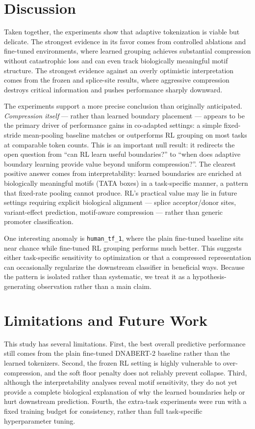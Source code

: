 \documentclass[sigconf,screen]{acmart}
\newcommand{\dnabert}{DNABERT-2\xspace}
\begin{document}
\section{Discussion}
Taken together, the experiments show that adaptive tokenization is viable but delicate. The strongest evidence in its favor comes from controlled ablations and fine-tuned environments, where learned grouping achieves substantial compression without catastrophic loss and can even track biologically meaningful motif structure. The strongest evidence against an overly optimistic interpretation comes from the frozen and splice-site results, where aggressive compression destroys critical information and pushes performance sharply downward.

The experiments support a more precise conclusion than originally anticipated. \emph{Compression itself} — rather than learned boundary placement — appears to be the primary driver of performance gains in co-adapted settings: a simple fixed-stride mean-pooling baseline matches or outperforms RL grouping on most tasks at comparable token counts. This is an important null result: it redirects the open question from ``can RL learn useful boundaries?'' to ``when does adaptive boundary learning provide value beyond uniform compression?''. The clearest positive answer comes from interpretability: learned boundaries are enriched at biologically meaningful motifs (TATA boxes) in a task-specific manner, a pattern that fixed-rate pooling cannot produce. RL's practical value may lie in future settings requiring explicit biological alignment — splice acceptor/donor sites, variant-effect prediction, motif-aware compression — rather than generic promoter classification.

One interesting anomaly is \texttt{human\_tf\_1}, where the plain fine-tuned baseline sits near chance while fine-tuned RL grouping performs much better. This suggests either task-specific sensitivity to optimization or that a compressed representation can occasionally regularize the downstream classifier in beneficial ways. Because the pattern is isolated rather than systematic, we treat it as a hypothesis-generating observation rather than a main claim.

\section{Limitations and Future Work}
\label{sec:limitations}
This study has several limitations. First, the best overall predictive performance still comes from the plain fine-tuned \dnabert baseline rather than the learned tokenizers. Second, the frozen RL setting is highly vulnerable to over-compression, and the soft floor penalty does not reliably prevent collapse. Third, although the interpretability analyses reveal motif sensitivity, they do not yet provide a complete biological explanation of why the learned boundaries help or hurt downstream prediction. Fourth, the extra-task experiments were run with a fixed training budget for consistency, rather than full task-specific hyperparameter tuning.
\end{document}
